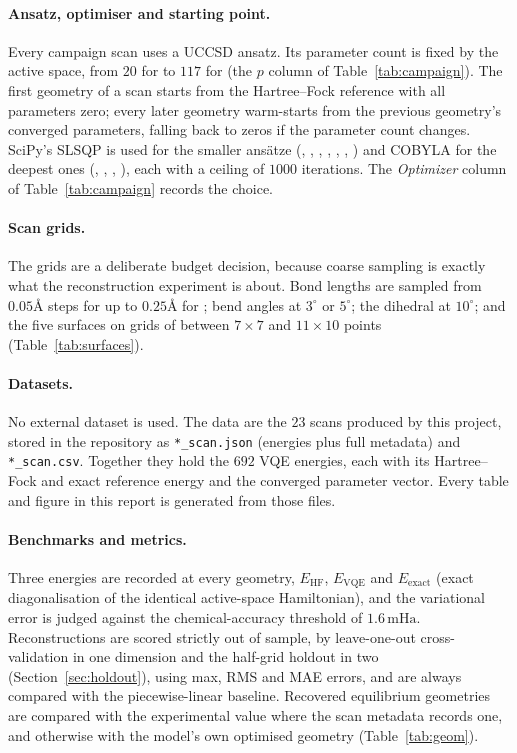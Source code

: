 \documentclass[sigconf,screen,nonacm]{acmart}
\newcommand{\mHa}{\,\text{mHa}}
\newcommand{\Ang}{\text{\AA}}
\begin{document}
\paragraph{Ansatz, optimiser and starting point.}
Every campaign scan uses a UCCSD ansatz. Its parameter count is fixed by the
active space, from $20$ for  to $117$ for  (the $p$ column of
Table~\ref{tab:campaign}). The first geometry of a scan starts from the
Hartree--Fock reference with all parameters zero; every later geometry
warm-starts from the previous geometry's converged parameters, falling back to
zeros if the parameter count changes. SciPy's SLSQP is used for the smaller
ans\"atze (, , , , , ,
) and COBYLA for the deepest ones (, , ,
), each with a ceiling of $1000$ iterations. The \emph{Optimizer}
column of Table~\ref{tab:campaign} records the choice.

\paragraph{Scan grids.}
The grids are a deliberate budget decision, because coarse sampling is
exactly what the reconstruction experiment is about. Bond lengths are sampled
from $0.05\Ang$ steps for  up to $0.25\Ang$ for ; bend angles
at $3^\circ$ or $5^\circ$; the  dihedral at $10^\circ$; and the five
surfaces on grids of between $7\times7$ and $11\times10$ points
(Table~\ref{tab:surfaces}).

\paragraph{Datasets.}
No external dataset is used. The data are the $23$ scans produced by this
project, stored in the repository as \texttt{*\_scan.json} (energies plus
full metadata) and \texttt{*\_scan.csv}. Together they hold the $692$ VQE
energies, each with its Hartree--Fock and exact reference energy and the
converged parameter vector. Every table and figure in this report is
generated from those files.

\paragraph{Benchmarks and metrics.}
Three energies are recorded at every geometry, $E_{\text{HF}}$,
$E_{\text{VQE}}$ and $E_{\text{exact}}$ (exact diagonalisation of the
identical active-space Hamiltonian), and the variational error is judged
against the chemical-accuracy threshold of $1.6\mHa$. Reconstructions are
scored strictly out of sample, by leave-one-out cross-validation in one
dimension and the half-grid holdout in two (Section~\ref{sec:holdout}), using
max, RMS and MAE errors, and are always compared with the piecewise-linear
baseline. Recovered equilibrium geometries are compared with the experimental
value where the scan metadata records one, and otherwise with the model's own
optimised geometry (Table~\ref{tab:geom}).
\end{document}
